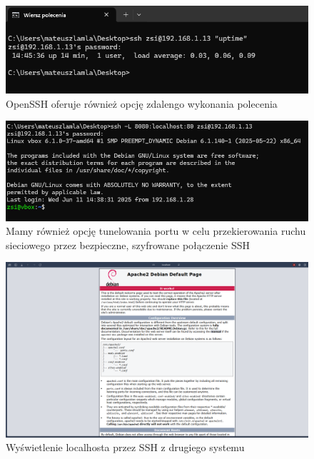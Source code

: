 \documentclass[0.82pt,a4paper]{article}
\begin{document}
    \begin{figure}[H]
        \centering
        \includegraphics[width=0.8\linewidth]{media/OpenSSH/4_zdalne wykonywanie_polecenia.png}
        \caption[zdalne polecenie ssh]{OpenSSH oferuje również opcję zdalengo wykonania polecenia}
        \label{fig:ssh_polecenie_zdalne}
    \end{figure}

    \begin{figure}[H]
        \centering
        \includegraphics[width=0.8\linewidth]{media/OpenSSH/5_tunelowanie_portu.png}
        \caption[tunelowanie portu ssh]{Mamy również opcję tunelowania portu w celu przekierowania ruchu sieciowego przez bezpieczne, szyfrowane połączenie SSH}
        \label{fig:ssh_tunelowanie_portu}
    \end{figure}

    \begin{figure}[H]
        \centering
        \includegraphics[width=0.8\linewidth]{media/OpenSSH/5_1_localhost_z_debiana_na_windowsie.png}
        \caption[pokazanie localhost ssh]{Wyświetlenie localhosta przez SSH z drugiego systemu}
        \label{fig:ssh_localhost}
    \end{figure}
\end{document}
